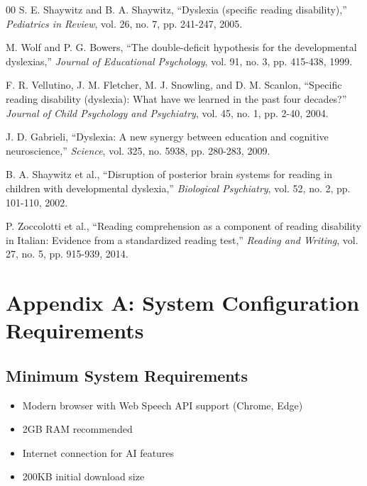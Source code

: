 \documentclass[journal]{IEEEtran}
\begin{document}
\begin{thebibliography}{00}
 S. E. Shaywitz and B. A. Shaywitz, ``Dyslexia (specific reading disability),'' \textit{Pediatrics in Review}, vol. 26, no. 7, pp. 241-247, 2005.

 M. Wolf and P. G. Bowers, ``The double-deficit hypothesis for the developmental dyslexias,'' \textit{Journal of Educational Psychology}, vol. 91, no. 3, pp. 415-438, 1999.

 F. R. Vellutino, J. M. Fletcher, M. J. Snowling, and D. M. Scanlon, ``Specific reading disability (dyslexia): What have we learned in the past four decades?'' \textit{Journal of Child Psychology and Psychiatry}, vol. 45, no. 1, pp. 2-40, 2004.

 J. D. Gabrieli, ``Dyslexia: A new synergy between education and cognitive neuroscience,'' \textit{Science}, vol. 325, no. 5938, pp. 280-283, 2009.

 B. A. Shaywitz et al., ``Disruption of posterior brain systems for reading in children with developmental dyslexia,'' \textit{Biological Psychiatry}, vol. 52, no. 2, pp. 101-110, 2002.

 P. Zoccolotti et al., ``Reading comprehension as a component of reading disability in Italian: Evidence from a standardized reading test,'' \textit{Reading and Writing}, vol. 27, no. 5, pp. 915-939, 2014.

\end{thebibliography}

\section*{Appendix A: System Configuration Requirements}

\subsection*{Minimum System Requirements}
\begin{itemize}
    \item Modern browser with Web Speech API support (Chrome, Edge)
    \item 2GB RAM recommended
    \item Internet connection for AI features
    \item 200KB initial download size
\end{itemize}
\end{document}

